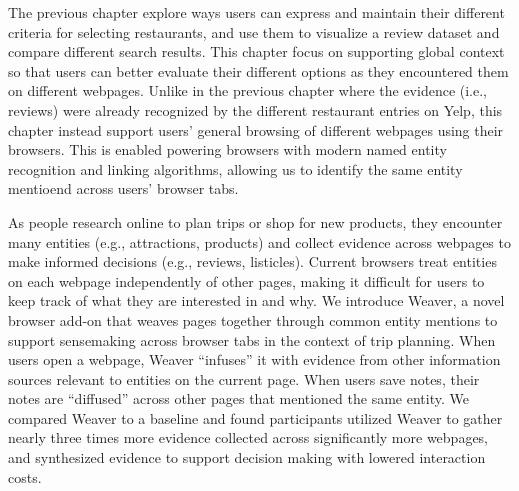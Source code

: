 
The previous chapter explore ways users can express and maintain their different criteria for selecting restaurants, and use them to visualize a review dataset and compare different search results. This chapter focus on supporting global context so that users can better evaluate their different options as they encountered them on different webpages. Unlike in the previous chapter where the evidence (i.e., reviews) were already recognized by the different restaurant entries on Yelp, this chapter instead support users' general browsing of different webpages using their browsers. This is enabled powering browsers with modern named entity recognition and linking algorithms, allowing us to identify the same entity mentioend across users' browser tabs.

As people research online to plan trips or shop for new products, they encounter many entities (e.g., attractions, products) and collect evidence across webpages to make informed decisions (e.g., reviews, listicles). Current browsers treat entities on each webpage independently of other pages, making it difficult for users to keep track of what they are interested in and why. We introduce Weaver, a novel browser add-on that weaves pages together through common entity mentions to support sensemaking across browser tabs in the context of trip planning. When users open a webpage, Weaver ``infuses'' it with evidence from other information sources relevant to entities on the current page. When users save notes, their notes are ``diffused'' across other pages that mentioned the same entity. We compared Weaver to a baseline and found participants utilized Weaver to gather nearly three times more evidence collected across significantly more webpages, and synthesized evidence to support decision making with lowered interaction costs.




